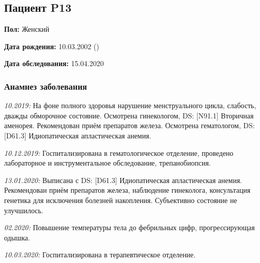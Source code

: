 \documentclass[a4paper,14pt]{extarticle}
\newcommand{\pdate}[1]{\emph{#1:} }
\newcommand{\cdate}[2]{\strong{#2 от #1:} }
\newcommand{\DS}[2]{[#2] #1}
\begin{document}
% 
% 
% 
% 
% 
%  
% 

\newpage
\subsection*{Пациент P13}

\textbf{Пол:} Женский

\textbf{Дата рождения:} 10.03.2002 ()

\textbf{Дата обследования:} 15.04.2020

\subsubsection*{Анамнез заболевания}

\pdate{10.2019} На фоне полного здоровья нарушение менструального цикла, слабость, дважды обморочное состояние.
Осмотрена гинекологом, DS: \DS{Вторичная аменорея}{N91.1}. Рекомендован приём препаратов железа.
Осмотрена гематологом, DS: \DS{Идиопатическая апластическая анемия}{D61.3}.

\pdate{10.12.2019} Госпитализирована в гематологическое отделение, проведено лабораторное и инструментальное обследование, трепанобиопсия.

\pdate{13.01.2020} Выписана с DS: \DS{Идиопатическая апластическая анемия}{D61.3}. Рекомендован приём препаратов железа, наблюдение гинеколога, консультация генетика для исключения болезней накопления.
Субъективно состояние не улучшилось.

\pdate{02.2020} Повышение температуры тела до фебрильных цифр, прогрессирующая одышка.

\pdate{10.03.2020} Госпитализирована в терапевтическое отделение.
\end{document}
